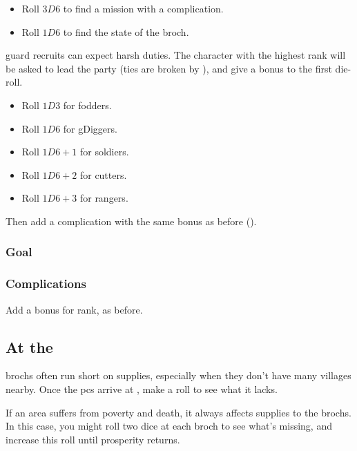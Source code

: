 \begin{multicols}{2}

\begin{itemize}
  \item
  Roll $3D6$ to find a mission with a complication.
  \item
  Roll $1D6$ to find the state of the \gls{broch}.
\end{itemize}

\noindent
\Gls{guard} recruits can expect harsh duties.
The character with the highest rank will be asked to lead the party (ties are broken by ), and give a bonus to the first die-roll.

\begin{itemize}
  \item
  Roll $1D3$ for \glspl{fodder}.
  \item
  Roll $1D6$ for \glspl{gDigger}.
  \item
  Roll $1D6+1$ for \glspl{soldier}.
  \item
  Roll $1D6+2$ for \glspl{cutter}.
  \item
  Roll $1D6+3$ for \glspl{ranger}.
\end{itemize}

Then add a complication with the same bonus as before ().

\subsubsection{Goal}

\ngMissions

\subsubsection{Complications}

Add a bonus for rank, as before.

\missionComplications

\subsection{At the }

\Glspl{broch} often run short on supplies, especially when they don't have many \glspl{village} nearby.
Once the \glspl{pc} arrive at , make a roll to see what it lacks.

\brochDerths

If an area suffers from poverty and death, it always affects supplies to the \glspl{broch}.
In this case, you might roll two dice at each \gls{broch} to see what's missing, and increase this roll until prosperity returns.

\end{multicols}

